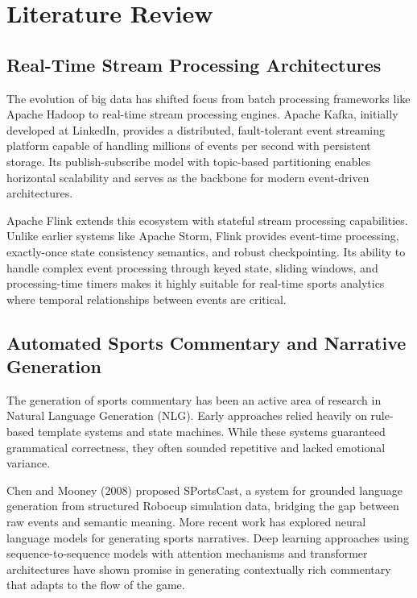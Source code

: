 \documentclass[12pt,a4paper]{article}
\begin{document}

\newpage
\section{Literature Review}

\subsection{Real-Time Stream Processing Architectures}
The evolution of big data has shifted focus from batch processing frameworks like Apache Hadoop to real-time stream processing engines. Apache Kafka, initially developed at LinkedIn, provides a distributed, fault-tolerant event streaming platform capable of handling millions of events per second with persistent storage. Its publish-subscribe model with topic-based partitioning enables horizontal scalability and serves as the backbone for modern event-driven architectures.

Apache Flink extends this ecosystem with stateful stream processing capabilities. Unlike earlier systems like Apache Storm, Flink provides event-time processing, exactly-once state consistency semantics, and robust checkpointing. Its ability to handle complex event processing through keyed state, sliding windows, and processing-time timers makes it highly suitable for real-time sports analytics where temporal relationships between events are critical.

\subsection{Automated Sports Commentary and Narrative Generation}
The generation of sports commentary has been an active area of research in Natural Language Generation (NLG). Early approaches relied heavily on rule-based template systems and state machines. While these systems guaranteed grammatical correctness, they often sounded repetitive and lacked emotional variance.

Chen and Mooney (2008) proposed SPortsCast, a system for grounded language generation from structured Robocup simulation data, bridging the gap between raw events and semantic meaning. More recent work has explored neural language models for generating sports narratives. Deep learning approaches using sequence-to-sequence models with attention mechanisms and transformer architectures have shown promise in generating contextually rich commentary that adapts to the flow of the game.
\end{document}

